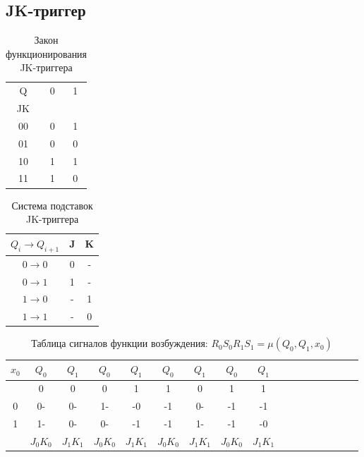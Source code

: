 \documentclass[a4paper,10pt]{article}
\begin{document}
	\subsection*{JK-триггер}
    		\begin{table}[h!]
				\center
    			\begin{tabular}{|c|c|c|}
					\hline
					 Q  & 0 & 1 \\
					 JK &   &   \\ \hline
					 00 & 0 & 1 \\ \hline
					 01 & 0 & 0 \\ \hline
					 10 & 1 & 1 \\ \hline
					 11 & 1 & 0 \\ \hline
				\end{tabular}
    			\caption{Закон функционирования JK-триггера}
    		\end{table}
    		\begin{table}[h!]
				\center
    			\begin{tabular}{|c|c|c|}
					\hline
            $Q_i \to Q_{i+1}$  & J & K \\ \hline
					 $0 \to 0$ & 0 & - \\ \hline
					 $0 \to 1$ & 1 & - \\ \hline
					 $1 \to 0$ & - & 1 \\ \hline
					 $1 \to 1$ & - & 0 \\ \hline
				\end{tabular}
    			\caption{Система подставок JK-триггера}
    		\end{table}
    		\begin{table}[h!]
				\center
        		\begin{tabular}{|c||c|c||c|c||c|c||c|c||c|c||c|c||c|c||c|c|}
				 \hline
			     $x_0$ &  $Q_0$ & $Q_1$  &  $Q_0$ & $Q_1$  &  $Q_0$ & $Q_1$  &  $Q_0$ & $Q_1$ \\ \hline
					   &    0   &   0    &    0   &   1    &    1   &   0    &    1   &   1   \\ \hline
					0  &   0-   &  0-    &   1-   &  -0    &   -1   &  0-    &   -1   &  -1   \\ \hline
					1  &   1-   &  0-    &   0-   &  -1    &   -1   &  1-    &   -1   &  -0   \\ \hline
					   &$J_0K_0$&$J_1K_1$&$J_0K_0$&$J_1K_1$&$J_0K_0$&$J_1K_1$&$J_0K_0$&$J_1K_1$ \\ \hline
        		\end{tabular}
    			\caption{Таблица сигналов функции возбуждения: $R_0S_0R_1S_1 = \mu(Q_0,Q_1,x_0)$}
    		\end{table}
\end{document}
